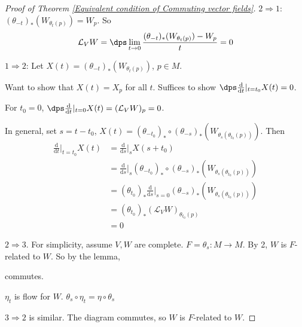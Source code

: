  \begin{proof}[Proof of Theorem \ref{Equivalent condition of Commuting vector fields}]
     $ 2\Rightarrow 1 $:  $ (\theta_{-t})_*(W_{\theta_t(p)})=W_p $. So  \[ \mathcal L_VW=\dps\lim\limits_{t\to 0}\frac{(\theta_{-t})_*(W_{\theta_t(p)})-W_p}{t}=0 \]
     
     
     $ 1\Rightarrow 2 $: Let  $ X(t)=(\theta_{-t})_*(W_{\theta_t(p)}) $,  $ p\in M $.
     
     Want to show that  $ X(t)=X_p $ for all  $ t $. Suffices to show  $ \dps\frac{\mathrm{d}}{\mathrm{d}t}|_{t=t_0}X(t)=0 $. 
     
     For  $ t_0=0 $,  $ \dps\frac{\mathrm{d}}{\mathrm{d}t}|_{t=0}X(t)=(\mathcal{L}_VW)_p=0 $.
     
     In general, set  $ s=t-t_0 $,  $ X(t)=(\theta_{-t_0})_*\circ (\theta_{-s})_*(W_{\theta_s(\theta_{t_0}(p))}) $.
     Then 
     \begin{align*}
        \frac{\mathrm{d}}{\mathrm{d}t}|_{t=t_0}X(t)&=\frac{\mathrm{d}}{\mathrm{d}s}|_sX(s+t_0)\\
        &=\frac{\mathrm{d}}{\mathrm{d}s}|_s(\theta_{-t_0})_*\circ (\theta_{-s})_*(W_{\theta_s(\theta_{t_0}(p))})\\
        &=(\theta_{t_0})_*\frac{\mathrm{d}}{\mathrm{d}s}|_{s=0}(\theta_{-s})_*(W_{\theta_s(\theta_{t_0}(p))})\\
        &=(\theta_{t_0})_*(\mathcal{L}_VW)_{\theta_{t_0}(p)}\\
        &=0
     \end{align*}
     
      $ 2\Rightarrow3 $. For simplicity, assume  $ V,W $ are complete.  $ F=\theta_s:M\rightarrow M $. By 2,  $ W $ is  $ F $-related to  $ W $. So by the lemma,
      \begin{center}
        commutes.
    \end{center}  
    
    $ \eta_t $ is flow for  $ W $. \ie  $ \theta_s\circ\eta_t=\eta\circ \theta_s $ 
      
       $ 3\Rightarrow 2 $  is similar. The diagram commutes, so  $ W $ is  $ F $-related to  $ W $.   
 \end{proof}